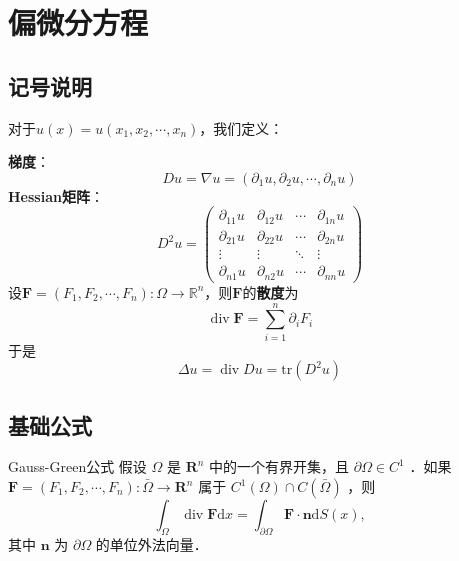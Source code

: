 \documentclass{mynote}
\begin{document}
\setcounter{page}{1} %
\tableofcontents %
\newpage %
\setcounter{page}{1} %


\chapter{偏微分方程}

\section{记号说明}
对于$u(x)=u(x_1,x_2,\cdots,x_n)$，我们定义：

\textbf{梯度}：
\[
    Du=\nabla u=\left(\partial_{1} u, \partial_{2} u, \cdots, \partial_{n} u\right)
\]
\textbf{Hessian矩阵}：
\[
    D^2u=\begin{pmatrix}
        \partial_{11} u & \partial_{12} u & \cdots & \partial_{1n} u \\
        \partial_{21} u & \partial_{22} u & \cdots & \partial_{2n} u \\
        \vdots & \vdots & \ddots & \vdots \\
        \partial_{n1} u & \partial_{n2} u & \cdots & \partial_{nn} u
    \end{pmatrix}
\]
设$\boldsymbol{F}=(F_1,F_2,\cdots,F_n):\Omega\to \mathbb{R}^n$，则$\boldsymbol{F}$的\textbf{散度}为
\[
    \operatorname{div} \boldsymbol{F}=\sum_{i=1}^n \partial_{i} F_i
\]
于是
\[
    \Delta u=\operatorname{div} Du=\mathrm{tr}(D^2u)
\]

\section{基础公式}
\begin{theorem}{Gauss-Green公式}
    假设 $\Omega$ 是 $\mathbf{R}^n$ 中的一个有界开集，且 $\partial \Omega \in C^1$ ．如果 $\boldsymbol{F}=\left(F_1, F_2, \cdots, F_n\right): \bar{\Omega} \rightarrow \mathbf{R}^n$ 属于 $C^1(\Omega) \cap C(\bar{\Omega})$ ，则
    \begin{equation}\label{Gauss-Green}
        \int_{\Omega} \operatorname{div} \boldsymbol{F} \mathrm{d} x=\int_{\partial \Omega} \boldsymbol{F} \cdot \boldsymbol{n} \mathrm{d} S(x),
    \end{equation}
    其中 $\boldsymbol{n}$ 为 $\partial \Omega$ 的单位外法向量．
\end{theorem}
\end{document}
